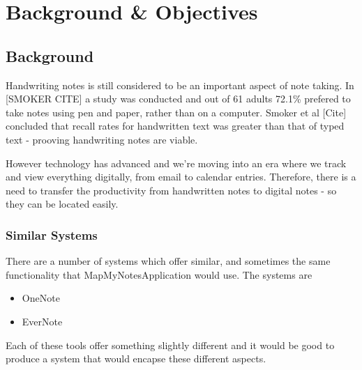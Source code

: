 \chapter{Background \& Objectives}






\section{Background}
Handwriting notes is still considered to be an important aspect of note taking. In [SMOKER CITE] a study was conducted and out of 61 adults 72.1\% prefered to take notes using pen and paper, rather than on a computer. Smoker et al [Cite]  concluded that recall rates for handwritten text was greater than that of typed text - prooving handwriting notes are viable.

However technology has advanced and we're moving into an era where we track and view everything digitally, from email to calendar entries. Therefore, there is a need to transfer the productivity from handwritten notes to digital notes - so they can be located easily.

\subsection{Similar Systems}
There are a number of systems which offer similar, and sometimes the same functionality that MapMyNotesApplication would use. The systems are
\begin{itemize}
  \item OneNote
  \item EverNote
\end{itemize}
Each of these tools offer something slightly different and it would be good to produce a system that would encapse these different aspects.

